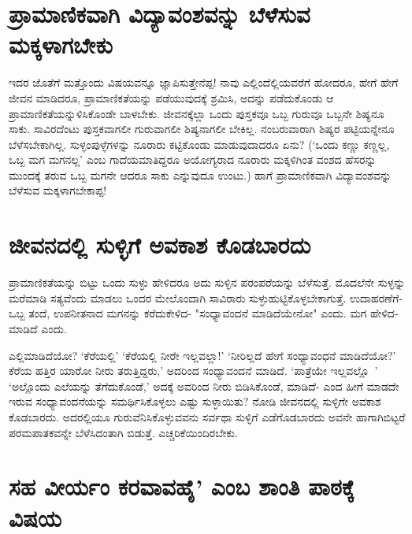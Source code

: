 \section*{ಪ್ರಾಮಾಣಿಕವಾಗಿ ವಿದ್ಯಾವಂಶವನ್ನು ಬೆಳೆಸುವ ಮಕ್ಕಳಾಗಬೇಕು}

ಇದರ ಜೊತೆಗೆ ಮತ್ತೊಂದು ವಿಷಯವನ್ನೂ ಜ್ಞಾಪಿಸುತ್ತೇನೆಪ್ಪ! ನಾವು ಎಲ್ಲಿಂದೆಲ್ಲಿಯವರೆಗೆ ಹೋದರೂ, ಹೇಗೆ ಹೇಗೆ ಜೀವನ ಮಾಡಿದರೂ, ಪ್ರಾಮಾಣಿಕತೆಯನ್ನು ಪಡೆಯುವುದಕ್ಕೆ ಶ್ರಮಿಸಿ, ಅದನ್ನು ಪಡೆದುಕೊಂಡು ಆ ಪ್ರಾಮಾಣಿಕತೆಯನ್ನುಳಿಸಿಕೊಂಡೇ ಬಾಳಬೇಕು. ಜೀವನಕ್ಕೆಲ್ಲಾ ಒಂದು ಪುಸ್ತಕವೂ ಒಬ್ಬ ಗುರುವೂ ಒಬ್ಬನೇ ಶಿಷ್ಯನೂ ಸಾಕು. ಸಾವಿರದೆಂಟು ಪುಸ್ತಕವಾಗಲೀ ಗುರುವಾಗಲೀ ಶಿಷ್ಯನಾಗಲೀ ಬೇಕಿಲ್ಲ. ನಂಬರುವಾರಾಗಿ ಶಿಷ್ಯರ ಪಟ್ಟಿಯನ್ನೇನೂ ಬೆಳೆಸಬೇಕಾಗಿಲ್ಲ. ಸುಳ್ಳಂಪುಳ್ಳೆಗಳನ್ನು ನೂರಾರು ಕಟ್ಟಿಕೊಂಡು ಮಾಡುವುದಾದರೂ ಏನು? (`ಒಂದು ಕಣ್ಣು ಕಣ್ಣಲ್ಲ, ಒಬ್ಬ ಮಗ ಮಗನಲ್ಲ' ಎಂಬ ಗಾದೆಯಮಾತಿದ್ದರೂ ಅಯೋಗ್ಯರಾದ ನೂರಾರು ಮಕ್ಕಳಿಗಿಂತ ವಂಶದ ಹೆಸರನ್ನು ಮುಂದಕ್ಕೆ ತರುವ ಒಬ್ಬ ಮಗನೇ ಆದರೂ ಸಾಕು ಎನ್ನುವುದೂ ಉಂಟು.) ಹಾಗೆ ಪ್ರಾಮಾಣಿಕವಾಗಿ ವಿದ್ಯಾವಂಶವನ್ನು ಬೆಳೆಸುವ ಮಕ್ಕಳಾಗಬೇಕಾಪ್ಪ!

\section*{ಜೀವನದಲ್ಲಿ ಸುಳ್ಳಿಗೆ ಅವಕಾಶ ಕೊಡಬಾರದು}

ಪ್ರಾಮಾಣಿಕತೆಯನ್ನು ಬಿಟ್ಟು ಒಂದು ಸುಳ್ಳು ಹೇಳಿದರೂ ಅದು ಸುಳ್ಳಿನ ಪರಂಪರೆಯನ್ನು ಬೆಳೆಸುತ್ತೆ. ಮೊದಲೆನೇ ಸುಳ್ಳನ್ನು ಮರೆಮಾಡಿ ಸತ್ಯವೆಂದು ಮಾಡಲು ಒಂದರ ಮೇಲೊಂದಾಗಿ ಸಾವಿರಾರು ಸುಳ್ಳುಹುಟ್ಟಿಕೊಳ್ಳಬೇಕಾಗುತ್ತೆ. ಉದಾಹರಣೆಗೆ- ಒಬ್ಬ ತಂದೆ, ಉಪನೀತನಾದ ಮಗನನ್ನು ಕರೆದುಕೇಳಿದ- "ಸಂಧ್ಯಾವಂದನೆ ಮಾಡಿದೆಯೇನೋ" ಎಂದು. ಮಗ ಹೇಳಿದ- ಮಾಡಿದೆ ಎಂದು. 

ಎಲ್ಲಿಮಾಡಿದೆಯೋ? `ಕೆರೆಯಲ್ಲಿ' `ಕೆರೆಯಲ್ಲಿ ನೀರೇ ಇಲ್ಲವಲ್ಲಾ!' `ನೀರಿಲ್ಲದೆ ಹೇಗೆ ಸಂಧ್ಯಾವಂಧನೆ ಮಾಡಿದೆಯೋ?' ಕೆರೆಯ ಹತ್ತಿರ ಯಾರೋ ನೀರು ತರುತ್ತಿದ್ದರು,' ಅದರಿಂದ ಸಂಧ್ಯಾವಂದನೆ ಮಾಡಿದೆ. `ಪಾತ್ರೆಯೇ ಇಲ್ಲವಲ್ಲೊ~' `ಅಲ್ಲೊಂದು ಎಲೆಯನ್ನು ತೆಗೆದುಕೊಂಡೆ,' ಅದಕ್ಕೆ ಅವರಿಂದ ನೀರು ಬಿಡಿಸಿಕೊಂಡೆ, ಮಾಡಿದೆ- ಎಂದ ಹೀಗೆ ಮಾಡದೇ ಇರುವ ಸಂಧ್ಯಾವಂದನೆಯನ್ನು ಸಮರ್ಥಿಸಿಕೊಳ್ಳಲು ಎಷ್ಟು ಸುಳ್ಳಾಯಿತು? ನೋಡಿ ಜೀವನದಲ್ಲಿ ಸುಳ್ಳಿಗೇ ಅವಕಾಶ ಕೊಡಬಾರದು. ಅದರಲ್ಲಿಯೂ ಗುರುವೆನಿಸಿಕೊಳ್ಳುವವನು ಸರ್ವಥಾ ಸುಳ್ಳಿಗೆ ಎಡೆಗೊಡಬಾರದು ಅವನೇ ಹಾಗಾಗಿಬಿಟ್ಟರೆ ಪರಮಪಾತಕವನ್ನೇ ಬೆಳೆಸಿದಂತಾಗಿ ಬಿಡುತ್ತೆ. ಎಚ್ಚರಿಕೆಯಿಂದಿರಬೇಕು.

\section*{ಸಹ ವೀರ್ಯಂ ಕರವಾವಹೈ' ಎಂಬ ಶಾಂತಿ ಪಾಠಕ್ಕೆ ವಿಷಯ}
\label{130b}

